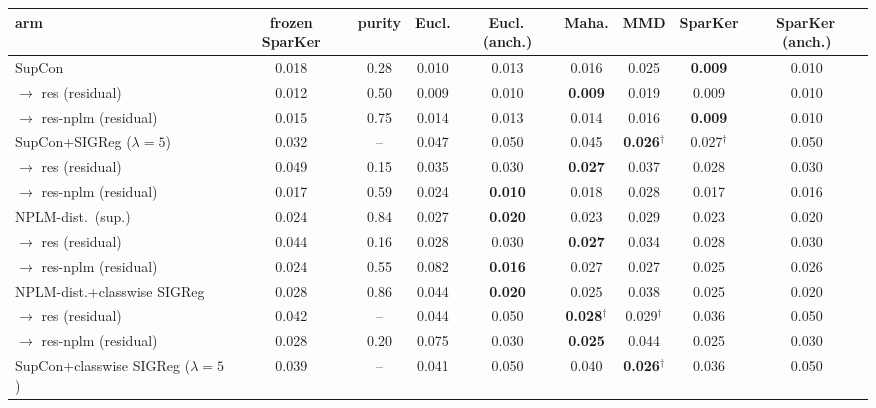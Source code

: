 \begin{table}[t]
\centering
\footnotesize
\begin{tabular}{lcccccccc}
\toprule
arm & frozen SparKer & purity & Eucl. & Eucl.\,(anch.) & Maha. & MMD & SparKer & SparKer\,(anch.) \\
\midrule
SupCon & 0.018 & 0.28 & 0.010 & 0.013 & 0.016 & 0.025 & \textbf{0.009} & 0.010 \\
\quad $\to$ res (residual) & 0.012 & 0.50 & 0.009 & 0.010 & \textbf{0.009} & 0.019 & 0.009 & 0.010 \\
\quad $\to$ res-nplm (residual) & 0.015 & 0.75 & 0.014 & 0.013 & 0.014 & 0.016 & \textbf{0.009} & 0.010 \\
\addlinespace
SupCon+SIGReg ($\lambda{=}5$) & 0.032 & -- & 0.047 & 0.050 & 0.045 & \textbf{0.026$^\dagger$} & 0.027$^\dagger$ & 0.050 \\
\quad $\to$ res (residual) & 0.049 & 0.15 & 0.035 & 0.030 & \textbf{0.027} & 0.037 & 0.028 & 0.030 \\
\quad $\to$ res-nplm (residual) & 0.017 & 0.59 & 0.024 & \textbf{0.010} & 0.018 & 0.028 & 0.017 & 0.016 \\
\addlinespace
NPLM-dist.\ (sup.) & 0.024 & 0.84 & 0.027 & \textbf{0.020} & 0.023 & 0.029 & 0.023 & 0.020 \\
\quad $\to$ res (residual) & 0.044 & 0.16 & 0.028 & 0.030 & \textbf{0.027} & 0.034 & 0.028 & 0.030 \\
\quad $\to$ res-nplm (residual) & 0.024 & 0.55 & 0.082 & \textbf{0.016} & 0.027 & 0.027 & 0.025 & 0.026 \\
\addlinespace
NPLM-dist.+classwise SIGReg & 0.028 & 0.86 & 0.044 & \textbf{0.020} & 0.025 & 0.038 & 0.025 & 0.020 \\
\quad $\to$ res (residual) & 0.042 & -- & 0.044 & 0.050 & \textbf{0.028$^\dagger$} & 0.029$^\dagger$ & 0.036 & 0.050 \\
\quad $\to$ res-nplm (residual) & 0.028 & 0.20 & 0.075 & 0.030 & \textbf{0.025} & 0.044 & 0.025 & 0.030 \\
\addlinespace
SupCon+classwise SIGReg ($\lambda{=}5$) & 0.039 & -- & 0.041 & 0.050 & 0.040 & \textbf{0.026$^\dagger$} & 0.036 & 0.050 \\

\end{tabular}
\end{table}
